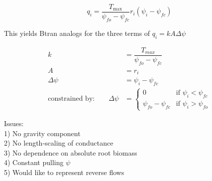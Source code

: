 \documentclass[draft,linenumbers]{agujournal}
\begin{document}
    \begin{linenomath*}
    \begin{equation} 
    q_i = \dfrac{T_{\text{max}}}{\psi_{fo}-\psi_{fc}} r_i \left(\psi_i-\psi_{fc} \right)
    \end{equation}
    \end{linenomath*}
    
    This yields Btran analogs for the three terms of $q_i = kA\Delta\psi$
    \begin{linenomath*}
    \begin{equation} \begin{aligned}
    k &= \dfrac{T_{max}}{\psi_{fo}-\psi_{fc}} \\
    A &= r_i \\
    \Delta\psi &= \psi_i - \psi_{fc} \\
    \mbox{constrained by:} \qquad
    \Delta\psi &=
    \begin{cases}
    0                          & \text{if } \psi_i<\psi_{fc}  \\
    \psi_{fo}-\psi_{fc} & \text{if } \psi_i>\psi_{fo}
    \end{cases}
    \end{aligned}\end{equation}
    \end{linenomath*}
    
    Issues: \\
    1) No gravity component \\
    2) No length-scaling of conductance \\
    3) No dependence on absolute root biomass \\
    4) Constant pulling $\psi$ \\
    5) Would like to represent reverse flows \\
    
\clearpage    
\end{document}
